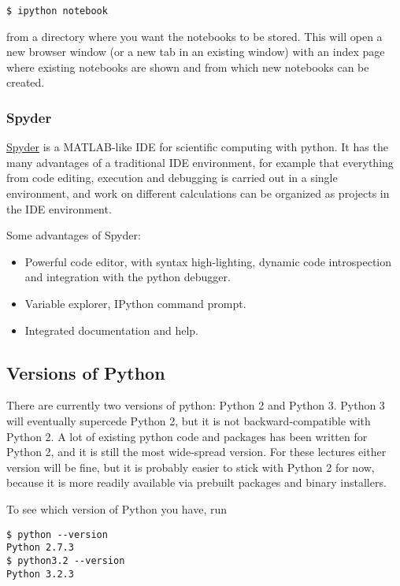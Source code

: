 \documentclass[11pt]{article}
\providecommand{\tightlist}{%
      \setlength{\itemsep}{0pt}\setlength{\parskip}{0pt}}
\begin{document}
\begin{verbatim}
$ ipython notebook
\end{verbatim}

from a directory where you want the notebooks to be stored. This will
open a new browser window (or a new tab in an existing window) with an
index page where existing notebooks are shown and from which new
notebooks can be created.

    \hypertarget{spyder}{%
\subsubsection{Spyder}\label{spyder}}

    \href{http://code.google.com/p/spyderlib/}{Spyder} is a MATLAB-like IDE
for scientific computing with python. It has the many advantages of a
traditional IDE environment, for example that everything from code
editing, execution and debugging is carried out in a single environment,
and work on different calculations can be organized as projects in the
IDE environment.

Some advantages of Spyder:

\begin{itemize}
\tightlist
\item
  Powerful code editor, with syntax high-lighting, dynamic code
  introspection and integration with the python debugger.
\item
  Variable explorer, IPython command prompt.
\item
  Integrated documentation and help.
\end{itemize}

    \hypertarget{versions-of-python}{%
\subsection{Versions of Python}\label{versions-of-python}}

    There are currently two versions of python: Python 2 and Python 3.
Python 3 will eventually supercede Python 2, but it is not
backward-compatible with Python 2. A lot of existing python code and
packages has been written for Python 2, and it is still the most
wide-spread version. For these lectures either version will be fine, but
it is probably easier to stick with Python 2 for now, because it is more
readily available via prebuilt packages and binary installers.

To see which version of Python you have, run

\begin{verbatim}
$ python --version
Python 2.7.3
$ python3.2 --version
Python 3.2.3
\end{verbatim}
\end{document}
